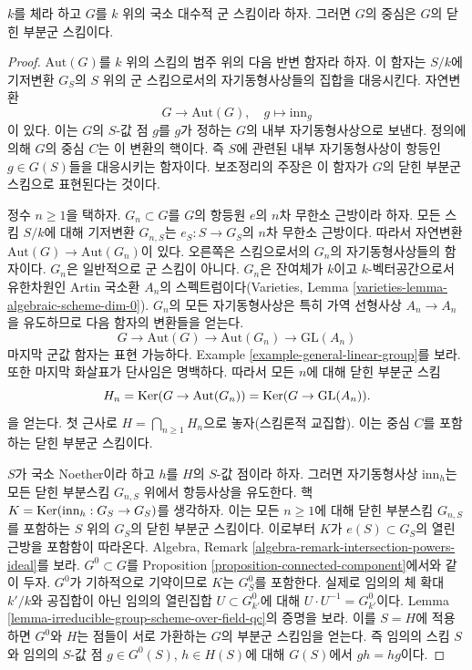 \begin{lemma}
\label{lemma-algebraic-center}
$k$를 체라 하고 $G$를 $k$ 위의 국소 대수적 군 스킴이라 하자. 그러면 $G$의 중심은
$G$의 닫힌 부분군 스킴이다.
\end{lemma}

\begin{proof}
$\text{Aut}(G)$를 $k$ 위의 스킴의 범주 위의 다음 반변 함자라 하자. 이 함자는 $S/k$에
기저변환 $G_S$의 $S$ 위의 군 스킴으로서의 자기동형사상들의 집합을 대응시킨다. 자연변환
$$
G \longrightarrow \text{Aut}(G),\quad
g \longmapsto \text{inn}_g
$$
이 있다. 이는 $G$의 $S$-값 점 $g$를 $g$가 정하는 $G$의 내부 자기동형사상으로 보낸다.
정의에 의해 $G$의 중심 $C$는 이 변환의 핵이다. 즉 $S$에 관련된 내부 자기동형사상이
항등인 $g \in G(S)$들을 대응시키는 함자이다. 보조정리의 주장은 이 함자가 $G$의 닫힌 부분군 스킴으로
표현된다는 것이다.

\medskip\noindent
정수 $n \geq 1$을 택하자. $G_n \subset G$를 $G$의 항등원 $e$의 $n$차 무한소 근방이라 하자.
모든 스킴 $S/k$에 대해 기저변환 $G_{n, S}$는 $e_S : S \to G_S$의 $n$차 무한소 근방이다.
따라서 자연변환 $\text{Aut}(G) \to \text{Aut}(G_n)$이 있다. 오른쪽은 스킴으로서의 $G_n$의
자기동형사상들의 함자이다. $G_n$은 일반적으로 군 스킴이 아니다. $G_n$은 잔여체가 $k$이고
$k$-벡터공간으로서 유한차원인 Artin 국소환 $A_n$의 스펙트럼이다(Varieties, Lemma
\ref{varieties-lemma-algebraic-scheme-dim-0}). $G_n$의 모든 자기동형사상은 특히 가역 선형사상
$A_n \to A_n$을 유도하므로 다음 함자의 변환들을 얻는다.
$$
G \to \text{Aut}(G) \to \text{Aut}(G_n) \to \text{GL}(A_n)
$$
마지막 군값 함자는 표현 가능하다. Example \ref{example-general-linear-group}를 보라. 또한 마지막 화살표가
단사임은 명백하다. 따라서 모든 $n$에 대해 닫힌 부분군 스킴
$$
H_n = \mathop{\mathrm{Ker}}(G \to \text{Aut}(G_n)) = \mathop{\mathrm{Ker}}(G \to \text{GL}(A_n)).
$$
을 얻는다. 첫 근사로 $H = \bigcap_{n \geq 1} H_n$으로 놓자(스킴론적 교집합). 이는 중심 $C$를 포함하는
닫힌 부분군 스킴이다.

\medskip\noindent
$S$가 국소 Noether이라 하고 $h$를 $H$의 $S$-값 점이라 하자. 그러면 자기동형사상 $\text{inn}_h$는
모든 닫힌 부분스킴 $G_{n, S}$ 위에서 항등사상을 유도한다. 핵
$K = \mathop{\mathrm{Ker}}(\text{inn}_h : G_S \to G_S)$를 생각하자. 이는 모든 $n \geq 1$에 대해 닫힌 부분스킴
$G_{n, S}$를 포함하는 $S$ 위의 $G_S$의 닫힌 부분군 스킴이다. 이로부터 $K$가
$e(S) \subset G_S$의 열린 근방을 포함함이 따라온다. Algebra, Remark
\ref{algebra-remark-intersection-powers-ideal}를 보라. $G^0 \subset G$를 Proposition
\ref{proposition-connected-component}에서와 같이 두자. $G^0$가 기하적으로 기약이므로 $K$는 $G^0_S$를 포함한다.
실제로 임의의 체 확대 $k'/k$와 공집합이 아닌 임의의 열린집합 $U \subset G^0_{k'}$에 대해
$U \cdot U^{-1} = G^0_{k'}$이다. Lemma \ref{lemma-irreducible-group-scheme-over-field-qc}의 증명을 보라.
이를 $S = H$에 적용하면 $G^0$와 $H$는 점들이 서로 가환하는 $G$의 부분군 스킴임을 얻는다.
즉 임의의 스킴 $S$와 임의의 $S$-값 점 $g \in G^0(S)$, $h \in H(S)$에 대해 $G(S)$에서 $gh = hg$이다.


\end{proof}
